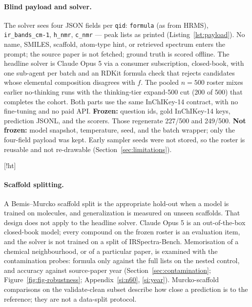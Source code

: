 \documentclass{article}
\makeatletter
\newcounter{listing}
\newenvironment{listing}
  {\@float{listing}}
  {\end@float}
\makeatother
\begin{document}
\paragraph{Blind payload and solver.}
The solver sees four JSON fields per \texttt{qid}: \texttt{formula} (as from
HRMS), \texttt{ir\_bands\_cm-1}, \texttt{h\_nmr}, \texttt{c\_nmr} --- peak
lists as printed (Listing~\ref{lst:payload}).
No name, SMILES, scaffold, atom-type hint, or retrieved spectrum enters the
prompt; the source paper is not fetched; ground truth is scored offline.
The headline solver is Claude Opus 5 via a consumer subscription,
closed-book, with one sub-agent per batch and an RDKit formula check that
rejects candidates whose elemental composition disagrees with $f$.
The pooled $n{=}500$ roster mixes earlier no-thinking runs with the thinking-tier
expand-500 cut (200 of 500) that completes the cohort.
Both parts use the same InChIKey-14 contract, with no fine-tuning and no paid API.
\textbf{Frozen:} question ids, gold InChIKey-14 keys, prediction JSONL, and the scorers.
Those regenerate 227/500 and 249/500.
\textbf{Not frozen:} model snapshot, temperature, seed, and the batch wrapper;
only the four-field payload was kept.
Early sampler seeds were not stored, so the roster is reusable and not re-drawable
(Section~\ref{sec:limitations}).

\begin{listing}[!ht]

\caption{One IRexp JSON record
(commercial DoR; \texttt{ILJNJJNKEOAREX})~\citep{yabbarov2026irexp}.
}
\label{lst:payload}
\end{listing}

\paragraph{Scaffold splitting.}
A Bemis--Murcko scaffold split is the appropriate hold-out when a model
is trained on molecules, and generalization is measured on unseen scaffolds.
That design does not apply to the headline solver.
Claude Opus 5 is an out-of-the-box closed-book model; every compound on
the frozen roster is an evaluation item, and the solver is not trained on
a split of IRSpectra-Bench.
Memorisation of a chemical neighbourhood, or of a particular paper, is
examined with the contamination probes: formula only against the full
lists on the nested control, and accuracy against source-paper year
(Section~\ref{sec:contamination}; Figure~\ref{fig:fig-robustness};
Appendix~\ref{si:n60}, \ref{si:year}).
Murcko-scaffold comparisons on the validate-clean subset describe
how close a prediction is to the reference; they are not a data-split
protocol.
\end{document}
